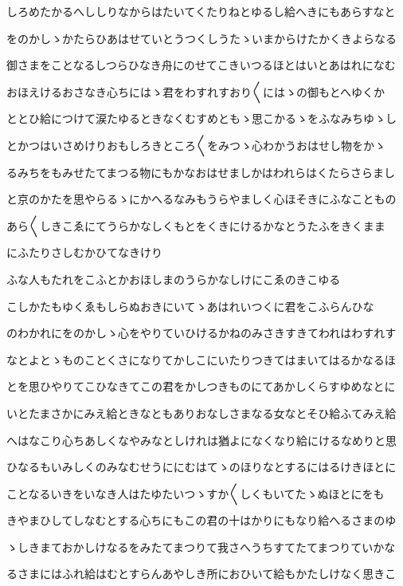 \documentclass[a4paper,11pt,landscape]{ltjtarticle}
\begin{document}
\par\medskip
しろめたかるへししりなからはたいてくたりねとゆるし給へきにもあらすなと
\par\medskip
をのかしゝかたらひあはせていとうつくしうたゝいまからけたかくきよらなる
\par\medskip
御さまをことなるしつらひなき舟にのせてこきいつるほとはいとあはれになむ
\par\medskip
おほえけるおさなき心ちにはゝ君をわすれすおり〱にはゝの御もとへゆくか
\par\medskip
ととひ給につけて涙たゆるときなくむすめともゝ思こかるゝをふなみちゆゝし
\par\medskip
とかつはいさめけりおもしろきところ〱をみつゝ心わかうおはせし物をかゝ
\par\medskip
るみちをもみせたてまつる物にもかなおはせましかはわれらはくたらさらまし
\par\medskip
と京のかたを思やらるゝにかへるなみもうらやましく心ほそきにふなこともの
\par\medskip
あら〱しきこゑにてうらかなしくもとをくきにけるかなとうたふをきくまま
\par\medskip
にふたりさしむかひてなきけり
\par\medskip
ふな人もたれをこふとかおほしまのうらかなしけにこゑのきこゆる
\par\medskip
こしかたもゆくゑもしらぬおきにいてゝあはれいつくに君をこふらんひな
\par\medskip
のわかれにをのかしゝ心をやりていひけるかねのみさきすきてわれはわすれす
\par\medskip
なとよとゝものことくさになりてかしこにいたりつきてはまいてはるかなるほ
\par\medskip
とを思ひやりてこひなきてこの君をかしつきものにてあかしくらすゆめなとに
\par\medskip
いとたまさかにみえ給ときなともありおなしさまなる女なとそひ給ふてみえ給
\par\medskip
へはなこり心ちあしくなやみなとしけれは猶よになくなり給にけるなめりと思
\par\medskip
ひなるもいみしくのみなむせうににむはてゝのほりなとするにはるけきほとに
\par\medskip
ことなるいきをいなき人はたゆたいつゝすか〱しくもいてたゝぬほとにをも
\par\medskip
きやまひしてしなむとする心ちにもこの君の十はかりにもなり給へるさまのゆ
\par\medskip
ゝしきまておかしけなるをみたてまつりて我さへうちすてたてまつりていかな
\par\medskip
るさまにはふれ給はむとすらんあやしき所におひいて給もかたしけなく思きこ
\end{document}
